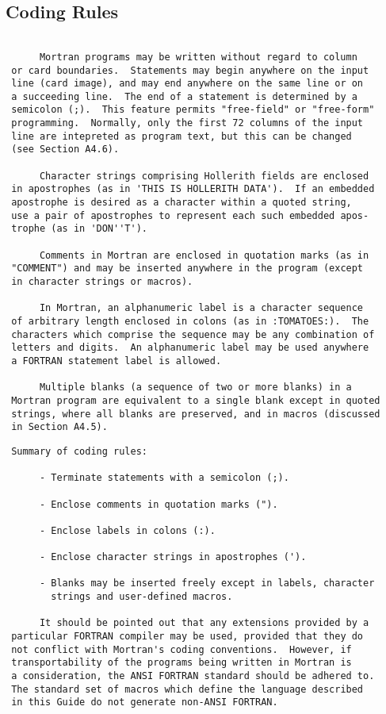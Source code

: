  \subsection{Coding Rules}
 \begin{verbatim}
 
      Mortran programs may be written without regard to column
 or card boundaries.  Statements may begin anywhere on the input
 line (card image), and may end anywhere on the same line or on
 a succeeding line.  The end of a statement is determined by a
 semicolon (;).  This feature permits "free-field" or "free-form"
 programming.  Normally, only the first 72 columns of the input
 line are intepreted as program text, but this can be changed
 (see Section A4.6).
 
      Character strings comprising Hollerith fields are enclosed
 in apostrophes (as in 'THIS IS HOLLERITH DATA').  If an embedded
 apostrophe is desired as a character within a quoted string,
 use a pair of apostrophes to represent each such embedded apos-
 trophe (as in 'DON''T').
 
      Comments in Mortran are enclosed in quotation marks (as in
 "COMMENT") and may be inserted anywhere in the program (except
 in character strings or macros).
 
      In Mortran, an alphanumeric label is a character sequence
 of arbitrary length enclosed in colons (as in :TOMATOES:).  The
 characters which comprise the sequence may be any combination of
 letters and digits.  An alphanumeric label may be used anywhere
 a FORTRAN statement label is allowed.
 
      Multiple blanks (a sequence of two or more blanks) in a
 Mortran program are equivalent to a single blank except in quoted
 strings, where all blanks are preserved, and in macros (discussed
 in Section A4.5).
\end{verbatim} 
\newpage \begin{verbatim}
 Summary of coding rules:
 
      - Terminate statements with a semicolon (;).
 
      - Enclose comments in quotation marks (").
 
      - Enclose labels in colons (:).
 
      - Enclose character strings in apostrophes (').
 
      - Blanks may be inserted freely except in labels, character
        strings and user-defined macros.
 
      It should be pointed out that any extensions provided by a
 particular FORTRAN compiler may be used, provided that they do
 not conflict with Mortran's coding conventions.  However, if
 transportability of the programs being written in Mortran is
 a consideration, the ANSI FORTRAN standard should be adhered to.
 The standard set of macros which define the language described
 in this Guide do not generate non-ANSI FORTRAN.
 \end{verbatim}
